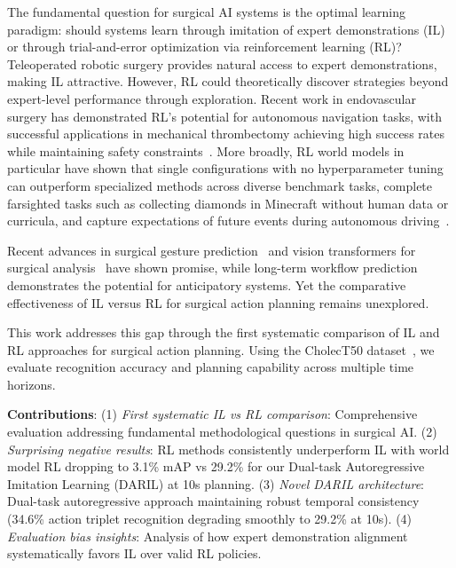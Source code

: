 \documentclass[runningheads]{llncs}
\begin{document}
The fundamental question for surgical AI systems is the optimal learning paradigm: should systems learn through imitation of expert demonstrations (IL) or through trial-and-error optimization via reinforcement learning (RL)? Teleoperated robotic surgery provides natural access to expert demonstrations, making IL attractive. However, RL could theoretically discover strategies beyond expert-level performance through exploration. Recent work in endovascular surgery has demonstrated RL's potential for autonomous navigation tasks, with successful applications in mechanical thrombectomy achieving high success rates while maintaining safety constraints~\cite{robertshaw2024autonomous,robertshaw2025reinforcement}. More broadly, RL world models in particular have shown that single configurations with no hyperparameter tuning can outperform specialized methods across diverse benchmark tasks, complete farsighted tasks such as collecting diamonds in Minecraft without human data or curricula, and capture expectations of future events during autonomous driving~\cite{hafner2023mastering,hansen2024tdmpc2,hu2023gaia}.

Recent advances in surgical gesture prediction~\cite{shi2022recognition,weerasinghe2024multimodal} and vision transformers for surgical analysis~\cite{wagner2023vision,liu2023skit} have shown promise, while long-term workflow prediction~\cite{boels2025swag} demonstrates the potential for anticipatory systems. Yet the comparative effectiveness of IL versus RL for surgical action planning remains unexplored.

This work addresses this gap through the first systematic comparison of IL and RL approaches for surgical action planning. Using the CholecT50 dataset~\cite{nwoye2022cholect50}, we evaluate recognition accuracy and planning capability across multiple time horizons.

\textbf{Contributions}: (1) \textit{First systematic IL vs RL comparison}: Comprehensive evaluation addressing fundamental methodological questions in surgical AI. (2) \textit{Surprising negative results}: RL methods consistently underperform IL with world model RL dropping to 3.1\% mAP vs 29.2\% for our Dual-task Autoregressive Imitation Learning (DARIL) at 10s planning. (3) \textit{Novel DARIL architecture}: Dual-task autoregressive approach maintaining robust temporal consistency (34.6\% action triplet recognition degrading smoothly to 29.2\% at 10s). (4) \textit{Evaluation bias insights}: Analysis of how expert demonstration alignment systematically favors IL over valid RL policies.
\end{document}
